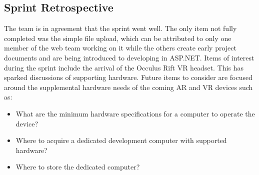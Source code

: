    \subsection{Sprint Retrospective}
    \label{sec:Sprint1_retrospective}
        \hspace{7mm}
        The team is in agreement that the sprint went well. The only item not fully completed was the simple
        file upload, which can be attributed to only one member of the web team working on it while the others
        create early project documents and are being introduced to developing in ASP.NET. Items of interest 
        during the sprint include the arrival of the Occulus Rift VR headset. This has sparked discussions of
        supporting hardware. Future items to consider are focused around the supplemental hardware needs of the coming AR and VR devices such as:
        \begin{itemize}
            \item What are the minimum hardware specifications for a computer to operate the device?
            \item Where to acquire a dedicated development computer with supported hardware?
            \item Where to store the dedicated computer? 
        \end{itemize}
